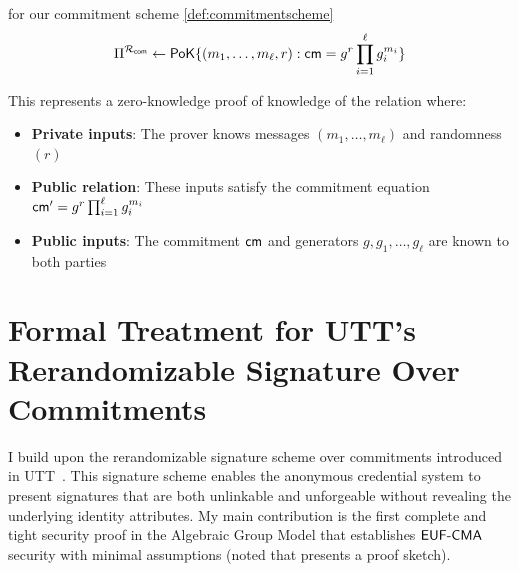 \begin{example} for our commitment scheme \ref{def:commitmentscheme}
$$\Pi^{\mathcal{R}_{\mathsf{com}}} \gets \mathsf{PoK}\{(m_1,\ldots,m_\ell, r): \mathsf{cm} = g^{r} \prod_{i=1}^\ell g_i^{m_i}\}$$

This represents a zero-knowledge proof of knowledge of the relation where:
\begin{itemize}
    \item \textbf{Private inputs}: The prover knows messages $(m_1,\ldots,m_\ell)$ and randomness $(r)$
    \item \textbf{Public relation}: These inputs satisfy the commitment equation $\mathsf{cm}' = g^{r } \prod_{i=1}^\ell g_i^{m_i}$
    \item \textbf{Public inputs}: The commitment $\mathsf{cm}$ and generators $g, g_1, \ldots, g_\ell$ are known to both parties
\end{itemize}
\end{example}























































\section{Formal Treatment for UTT's Rerandomizable Signature Over Commitments}\label{sec:formal_treatment_utt_rerand_sig}
I build upon the rerandomizable signature scheme over commitments introduced in UTT~\cite{tomescu_utt_2022}. This signature scheme enables the anonymous credential system to present signatures that are both unlinkable and unforgeable without revealing the underlying identity attributes. My main contribution is the first complete and tight security proof in the Algebraic Group Model that establishes $\mathsf{EUF\text{-}CMA}$ security with minimal assumptions (noted that \cite{tomescu_utt_2022} presents a proof sketch).



